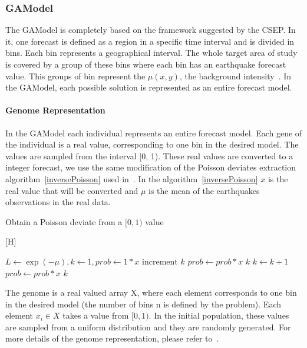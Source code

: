 \subsubsection{GAModel}\label{GAModel}
The GAModel is completely based on the framework suggested by the CSEP. In it, one forecast is defined as a region in a specific time interval and is divided in bins. Each bin represents a geographical interval. The whole target area of study is covered by a group of these bins where each bin has an earthquake forecast value. This groups of bin represent the $\mu(x,y)$, the background intensity~\cite{zhuang2004analyzing}. In the GAModel, each possible solution is represented as an entire forecast model.

\paragraph{Genome Representation}\label{genomeGA}
In the GAModel each individual represents an entire forecast model. Each gene of the individual is a real value, corresponding to one bin in the desired model. The values are sampled from the interval [0, 1). These real values are converted to a integer forecast, we use the same modification of the Poisson deviates extraction algorithm~\ref{inversePoisson} used in~\cite{ecta14}. In the algorithm~\ref{inversePoisson} $x$ is the real value that will be converted and $\mu$ is the mean of the earthquakes observations in the real data.

\begin{algorithm}\label{inversePoisson}
  \caption{Obtain a Poisson deviate from a $[0,1)$ value}
  \label{InversePoisson}[H]
  \begin{algorithmic}
    \STATE $L \gets \exp{(-\mu)}, k \gets 1, prob \gets 1 * x$
    \REPEAT 
    \STATE $\text{increment }k$
    \STATE $prob \gets prob*x$
    \RETURN $k$
		\STATE $k \gets k + 1$
	    \STATE $prob \gets prob*x$
	\ENDWHILE
    \RETURN $k$
  \end{algorithmic}
\end{algorithm}

The genome is a real valued array X, where each element corresponds to one bin in the desired model (the number of bins n is defined by the problem). Each element $x_i \in X$ takes a value from $[0,1)$. In the initial population, these values are sampled from a uniform distribution and they are randomly generated. For more details of the genome representation, please refer to~\cite{ecta14}.

